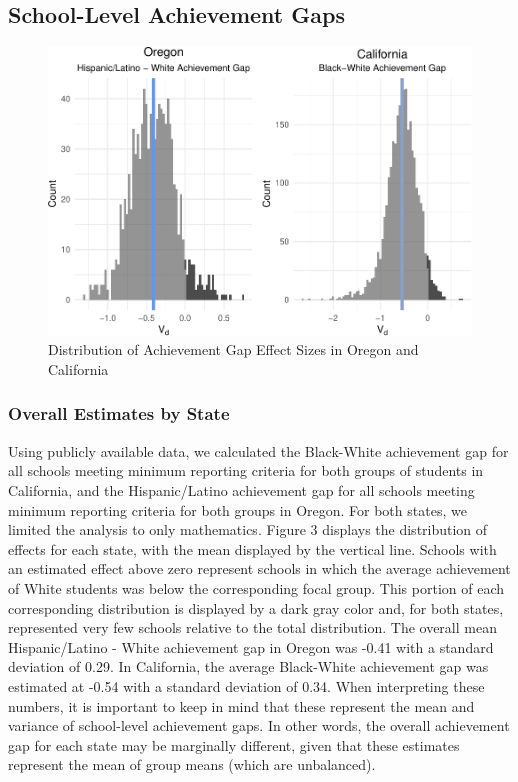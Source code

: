 \documentclass[man, fleqn, noextraspace]{apa6}
\theoremstyle{definition}
\theoremstyle{definition}
\theoremstyle{definition}
\theoremstyle{remark}
\begin{document}
\hypertarget{school-level-achievement-gaps}{%
\subsection{School-Level Achievement
Gaps}\label{school-level-achievement-gaps}}

\begin{figure}
\centering
\includegraphics{anderson_ncme18_files/figure-latex/unnamed-chunk-3-1.pdf}
\caption{\label{fig:unnamed-chunk-3}Distribution of Achievement Gap Effect
Sizes in Oregon and California}
\end{figure}

\hypertarget{overall-estimates-by-state}{%
\subsubsection{Overall Estimates by
State}\label{overall-estimates-by-state}}

Using publicly available data, we calculated the Black-White achievement
gap for all schools meeting minimum reporting criteria for both groups
of students in California, and the Hispanic/Latino achievement gap for
all schools meeting minimum reporting criteria for both groups in
Oregon. For both states, we limited the analysis to only mathematics.
Figure 3 displays the distribution of effects for each state, with the
mean displayed by the vertical line. Schools with an estimated effect
above zero represent schools in which the average achievement of White
students was below the corresponding focal group. This portion of each
corresponding distribution is displayed by a dark gray color and, for
both states, represented very few schools relative to the total
distribution. The overall mean Hispanic/Latino - White achievement gap
in Oregon was -0.41 with a standard deviation of 0.29. In California,
the average Black-White achievement gap was estimated at -0.54 with a
standard deviation of 0.34. When interpreting these numbers, it is
important to keep in mind that these represent the mean and variance of
school-level achievement gaps. In other words, the overall achievement
gap for each state may be marginally different, given that these
estimates represent the mean of group means (which are unbalanced).
\end{document}
